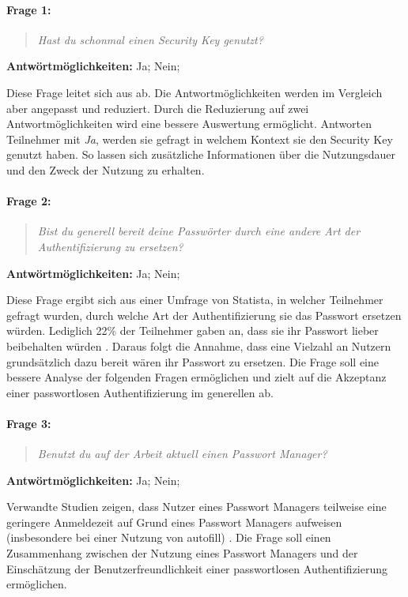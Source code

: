 \paragraph{Frage 1:}

\begin{quote}
    \textit{Hast du schonmal einen Security Key genutzt?}
\end{quote}
\textbf{Antwörtmöglichkeiten:} Ja; Nein; 

Diese Frage leitet sich aus \cite{farke2020you} ab. Die Antwortmöglichkeiten werden im Vergleich aber angepasst und reduziert. Durch die Reduzierung auf zwei Antwortmöglichkeiten wird eine bessere Auswertung ermöglicht. Antworten Teilnehmer mit \textit{Ja}, werden sie gefragt in welchem Kontext sie den Security Key genutzt haben. So lassen sich zusätzliche Informationen über die Nutzungsdauer und den Zweck der Nutzung zu erhalten.

\paragraph{Frage 2:}

\begin{quote}
    \textit{Bist du generell bereit deine Passwörter durch eine andere Art der Authentifizierung zu ersetzen?}
\end{quote}
\textbf{Antwörtmöglichkeiten:} Ja; Nein; 

Diese Frage ergibt sich aus einer Umfrage von Statista, in welcher Teilnehmer gefragt wurden, durch welche Art der Authentifizierung sie das Passwort ersetzen würden. Lediglich 22\% der Teilnehmer gaben an, dass sie ihr Passwort lieber beibehalten würden \cite{techstat}. Daraus folgt die Annahme, dass eine Vielzahl an Nutzern grundsätzlich dazu bereit wären ihr Passwort zu ersetzen. Die Frage soll eine bessere Analyse der folgenden Fragen ermöglichen und zielt auf die Akzeptanz einer passwortlosen Authentifizierung im generellen ab.

\paragraph{Frage 3:}

\begin{quote}
    \textit{Benutzt du auf der Arbeit aktuell einen Passwort Manager?}
\end{quote}

\textbf{Antwörtmöglichkeiten:} Ja; Nein;

Verwandte Studien zeigen, dass Nutzer eines Passwort Managers teilweise eine geringere Anmeldezeit auf Grund eines Passwort Managers aufweisen (insbesondere bei einer Nutzung von autofill) \cite{farke2020you}. Die Frage soll einen Zusammenhang zwischen der Nutzung eines Passwort Managers und der Einschätzung der Benutzerfreundlichkeit einer passwortlosen Authentifizierung ermöglichen.

